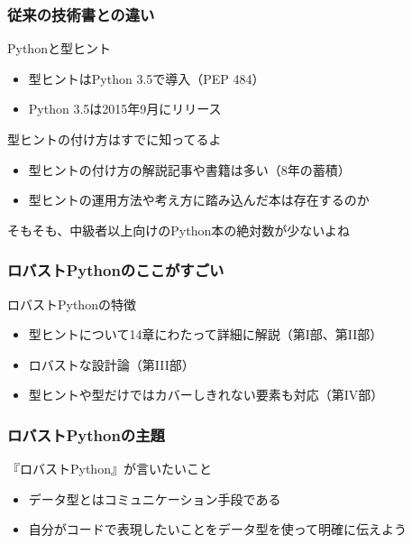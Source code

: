 \documentclass[aspectratio=169,dvipdfmx,12pt,notheorems]{beamer}
\theoremstyle{definition}
\begin{document}
\begin{frame}\frametitle{従来の技術書との違い}

\begin{exampleblock}{Pythonと型ヒント}
\begin{itemize}
\item 型ヒントはPython 3.5で導入（PEP 484）
\item Python 3.5は2015年9月にリリース
\end{itemize}
\end{exampleblock}

\begin{alertblock}{型ヒントの付け方はすでに知ってるよ}
\begin{itemize}
\item 型ヒントの付け方の解説記事や書籍は多い（8年の蓄積）
\item 型ヒントの運用方法や考え方に踏み込んだ本は存在するのか
\end{itemize}
\end{alertblock}
そもそも、中級者以上向けのPython本の絶対数が少ないよね
\end{frame}

\begin{frame}\frametitle{ロバストPythonのここがすごい}

\begin{block}{ロバストPythonの特徴}
\begin{itemize}
\item 型ヒントについて14章にわたって詳細に解説（第I部、第II部）
\item ロバストな設計論（第III部）
\item 型ヒントや型だけではカバーしきれない要素も対応（第IV部）
\end{itemize}
\end{block}
\end{frame}

\begin{frame}\frametitle{ロバストPythonの主題}

\begin{block}{『ロバストPython』が言いたいこと}
\begin{itemize}
\item データ型とはコミュニケーション手段である
\item 自分がコードで表現したいことをデータ型を使って明確に伝えよう
\end{itemize}
\end{block}

\end{frame}
\end{document}
